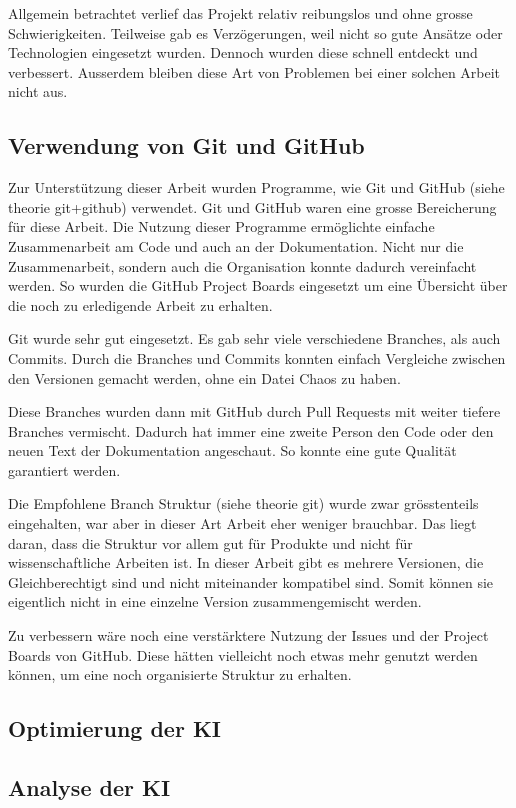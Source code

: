 Allgemein betrachtet verlief das Projekt relativ reibungslos und ohne grosse
Schwierigkeiten. Teilweise gab es Verzögerungen, weil nicht so gute Ansätze oder
Technologien eingesetzt wurden. Dennoch wurden diese schnell entdeckt und
verbessert. Ausserdem bleiben diese Art von Problemen bei einer solchen Arbeit
nicht aus.


\subsection*{Verwendung von Git und GitHub}
Zur Unterstützung dieser Arbeit wurden Programme, wie Git und GitHub (siehe
theorie git+github)  %
verwendet. Git und GitHub waren eine grosse Bereicherung für diese Arbeit. Die
Nutzung dieser Programme ermöglichte einfache Zusammenarbeit am Code und auch an
der Dokumentation. Nicht nur die Zusammenarbeit, sondern auch die Organisation
konnte dadurch vereinfacht werden. So wurden die GitHub Project Boards
eingesetzt um eine Übersicht über die noch zu erledigende Arbeit zu erhalten.

Git wurde sehr gut eingesetzt. Es gab sehr viele verschiedene Branches, als auch
Commits. Durch die Branches und Commits konnten einfach Vergleiche zwischen den
Versionen gemacht werden, ohne ein Datei Chaos zu haben.

Diese Branches wurden dann mit GitHub durch Pull Requests mit weiter tiefere
Branches vermischt. Dadurch hat immer eine zweite Person den Code oder den neuen
Text der Dokumentation angeschaut. So konnte eine gute Qualität garantiert
werden.

Die Empfohlene Branch Struktur (siehe theorie git) wurde zwar grösstenteils  %
eingehalten, war aber in dieser Art Arbeit eher weniger brauchbar. Das liegt
daran, dass die Struktur vor allem gut für Produkte und nicht für
wissenschaftliche Arbeiten ist. In dieser Arbeit gibt es mehrere Versionen, die
Gleichberechtigt sind und nicht miteinander kompatibel sind. Somit können sie
eigentlich nicht in eine einzelne Version zusammengemischt werden.

Zu verbessern wäre noch eine verstärktere Nutzung der Issues und der Project
Boards von GitHub. Diese hätten vielleicht noch etwas mehr genutzt werden
können, um eine noch organisierte Struktur zu erhalten.


\subsection*{Optimierung der KI}


\subsection*{Analyse der KI}

